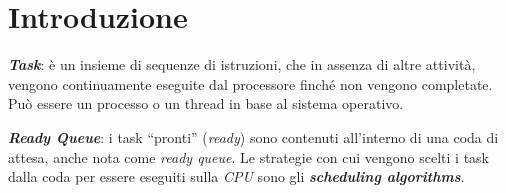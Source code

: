 \chapter{Introduzione}
\textbf{\textit{Task}}: è un insieme di sequenze di istruzioni, che in assenza di altre attività, vengono continuamente eseguite dal processore finché non vengono completate. \\
Può essere un processo o un thread in base al sistema operativo.
\begin{center}
\end{center}

\textbf{\textit{Ready Queue}}: i task ``pronti'' (\textit{ready}) sono contenuti all'interno di una coda di attesa, anche nota come \textit{ready queue}. Le strategie con cui vengono scelti i task dalla coda per essere eseguiti sulla \textit{CPU} sono gli \textbf{\textit{scheduling algorithms}}.

